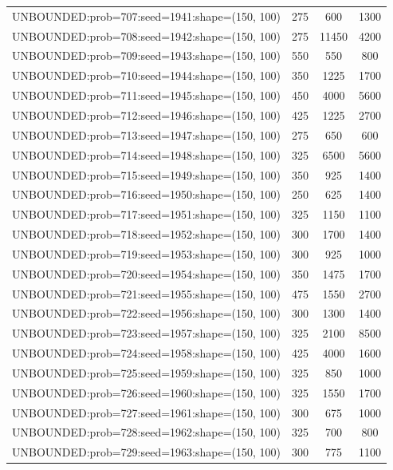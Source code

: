 \begin{longtable}{lccc}
UNBOUNDED:prob=707:seed=1941:shape=(150, 100) &      275 &   600 &   1300 \\
UNBOUNDED:prob=708:seed=1942:shape=(150, 100) &      275 & 11450 &   4200 \\
UNBOUNDED:prob=709:seed=1943:shape=(150, 100) &      550 &   550 &    800 \\
UNBOUNDED:prob=710:seed=1944:shape=(150, 100) &      350 &  1225 &   1700 \\
UNBOUNDED:prob=711:seed=1945:shape=(150, 100) &      450 &  4000 &   5600 \\
UNBOUNDED:prob=712:seed=1946:shape=(150, 100) &      425 &  1225 &   2700 \\
UNBOUNDED:prob=713:seed=1947:shape=(150, 100) &      275 &   650 &    600 \\
UNBOUNDED:prob=714:seed=1948:shape=(150, 100) &      325 &  6500 &   5600 \\
UNBOUNDED:prob=715:seed=1949:shape=(150, 100) &      350 &   925 &   1400 \\
UNBOUNDED:prob=716:seed=1950:shape=(150, 100) &      250 &   625 &   1400 \\
UNBOUNDED:prob=717:seed=1951:shape=(150, 100) &      325 &  1150 &   1100 \\
UNBOUNDED:prob=718:seed=1952:shape=(150, 100) &      300 &  1700 &   1400 \\
UNBOUNDED:prob=719:seed=1953:shape=(150, 100) &      300 &   925 &   1000 \\
UNBOUNDED:prob=720:seed=1954:shape=(150, 100) &      350 &  1475 &   1700 \\
UNBOUNDED:prob=721:seed=1955:shape=(150, 100) &      475 &  1550 &   2700 \\
UNBOUNDED:prob=722:seed=1956:shape=(150, 100) &      300 &  1300 &   1400 \\
UNBOUNDED:prob=723:seed=1957:shape=(150, 100) &      325 &  2100 &   8500 \\
UNBOUNDED:prob=724:seed=1958:shape=(150, 100) &      425 &  4000 &   1600 \\
UNBOUNDED:prob=725:seed=1959:shape=(150, 100) &      325 &   850 &   1000 \\
UNBOUNDED:prob=726:seed=1960:shape=(150, 100) &      325 &  1550 &   1700 \\
UNBOUNDED:prob=727:seed=1961:shape=(150, 100) &      300 &   675 &   1000 \\
UNBOUNDED:prob=728:seed=1962:shape=(150, 100) &      325 &   700 &    800 \\
UNBOUNDED:prob=729:seed=1963:shape=(150, 100) &      300 &   775 &   1100 \\

\end{longtable}
